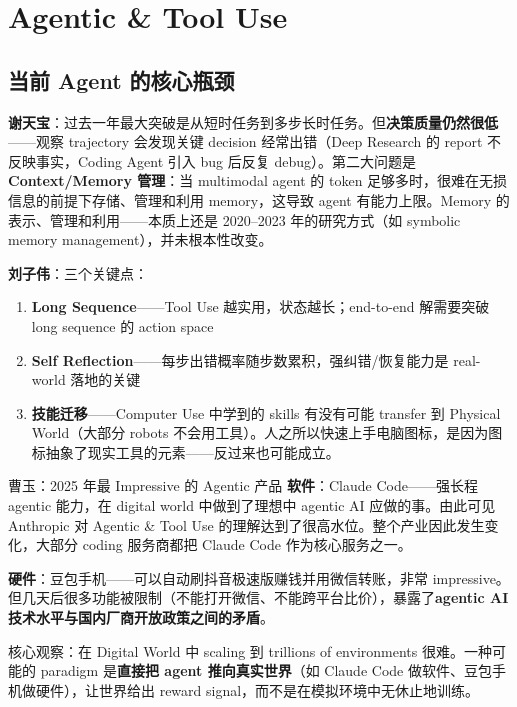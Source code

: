\documentclass[a4paper]{article}
\begin{document}
\section{Agentic \& Tool Use}

\subsection{当前 Agent 的核心瓶颈}

\textbf{谢天宝}：过去一年最大突破是从短时任务到多步长时任务。但\textbf{决策质量仍然很低}——观察 trajectory 会发现关键 decision 经常出错（Deep Research 的 report 不反映事实，Coding Agent 引入 bug 后反复 debug）。第二大问题是 \textbf{Context/Memory 管理}：当 multimodal agent 的 token 足够多时，很难在无损信息的前提下存储、管理和利用 memory，这导致 agent 有能力上限。Memory 的表示、管理和利用——本质上还是 2020--2023 年的研究方式（如 symbolic memory management），并未根本性改变。

\textbf{刘子伟}：三个关键点：
\begin{enumerate}
  \item \textbf{Long Sequence}——Tool Use 越实用，状态越长；end-to-end 解需要突破 long sequence 的 action space
  \item \textbf{Self Reflection}——每步出错概率随步数累积，强纠错/恢复能力是 real-world 落地的关键
  \item \textbf{技能迁移}——Computer Use 中学到的 skills 有没有可能 transfer 到 Physical World（大部分 robots 不会用工具）。人之所以快速上手电脑图标，是因为图标抽象了现实工具的元素——反过来也可能成立。
\end{enumerate}

\begin{importantbox}{曹玉：2025 年最 Impressive 的 Agentic 产品}
\textbf{软件}：Claude Code——强长程 agentic 能力，在 digital world 中做到了理想中 agentic AI 应做的事。由此可见 Anthropic 对 Agentic \& Tool Use 的理解达到了很高水位。整个产业因此发生变化，大部分 coding 服务商都把 Claude Code 作为核心服务之一。

\textbf{硬件}：豆包手机——可以自动刷抖音极速版赚钱并用微信转账，非常 impressive。但几天后很多功能被限制（不能打开微信、不能跨平台比价），暴露了\textbf{agentic AI 技术水平与国内厂商开放政策之间的矛盾}。

核心观察：在 Digital World 中 scaling 到 trillions of environments 很难。一种可能的 paradigm 是\textbf{直接把 agent 推向真实世界}（如 Claude Code 做软件、豆包手机做硬件），让世界给出 reward signal，而不是在模拟环境中无休止地训练。
\end{importantbox}
\end{document}
